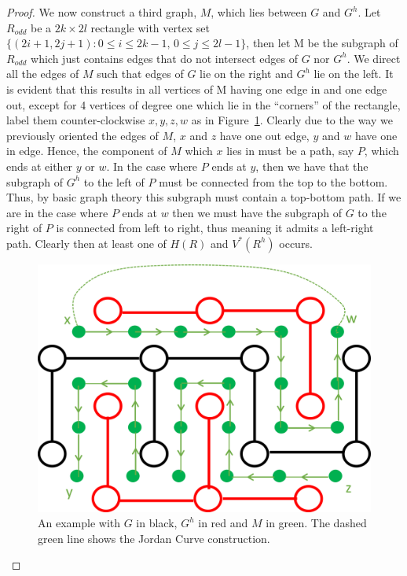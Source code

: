 \documentclass[a4paper,11pt]{article}
\theoremstyle{definition}
\begin{document}
\begin{proof}
	We now construct a third graph, $M$, which lies between $G$ and $G^h$. Let $R_{odd}$ be a $2k\times 2l$ rectangle with vertex set $\{(2i+1,2j+1): 0 \leq i \leq 2k-1 \text{, } 0 \leq j \leq 2l-1 \}$, then let M be the subgraph of $R_{odd}$ which just contains edges that do not intersect edges of $G$ nor $G^h$. We direct all the edges of $M$ such that edges of $G$ lie on the right and $G^h$ lie on the left. It is evident that this results in all vertices of M having one edge in and one edge out, except for 4 vertices of degree one which lie in the ``corners'' of the rectangle, label them counter-clockwise $x,y,z,w$ as in Figure~\ref*{fig:rectangleProof}. Clearly due to the way we previously oriented the edges of $M$, $x$ and $z$ have one out edge, $y$ and $w$ have one in edge. Hence, the component of $M$ which $x$ lies in must be a path, say $P$, which ends at either $y$ or $w$. In the case where $P$ ends at $y$, then we have that the subgraph of $G^h$ to the left of $P$ must be connected from the top to the bottom. Thus, by basic graph theory this subgraph must contain a top-bottom path. If we are in the case where $P$ ends at $w$ then we must have the subgraph of $G$ to the right of $P$ is connected from left to right, thus meaning it admits a left-right path. Clearly then at least one of $H(R)$ and $V^*(R^h)$ occurs.
	\begin{figure}
		\centering
		\includegraphics[scale=0.6]{drawings/rectanglesproof.png}
		\caption{An example with $G$ in black, $G^h$ in red and $M$ in green. The dashed green line shows the Jordan Curve construction.}
		\label{fig:rectangleProof}
	\end{figure}

\end{proof}
\end{document}
